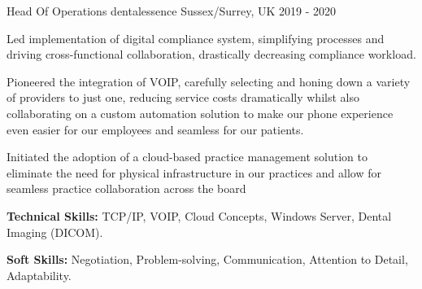

\begin{cventries}

  \cventry
    {Head Of Operations} %
    {dentalessence} %
    {Sussex/Surrey, UK} %
    {2019 - 2020} %
    {
      \begin{cvitems} %
        \item {Led implementation of digital compliance system, simplifying processes and driving cross-functional collaboration, drastically decreasing compliance workload.}
        \item {Pioneered the integration of VOIP, carefully selecting and honing down a variety of providers to just one, reducing service costs dramatically whilst also collaborating on a custom automation solution to make our phone experience even easier for our employees and seamless for our patients.}
        \item {Initiated the adoption of a cloud-based practice management solution to eliminate the need for physical infrastructure in our practices and allow for seamless practice collaboration across the board}
        \item {\textbf{Technical Skills:} TCP/IP, VOIP, Cloud Concepts, Windows Server, Dental Imaging (DICOM).}
        \item {\textbf{Soft Skills:} Negotiation, Problem-solving, Communication, Attention to Detail, Adaptability.}
      \end{cvitems}
    }


\end{cventries}
